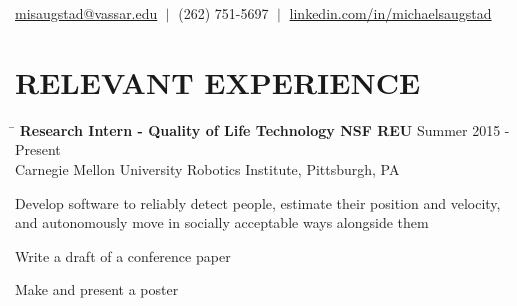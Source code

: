 \documentclass{res}
\newcommand{\vb}{\; | \;}
\begin{document}
 
                                  
\begin{resume}
\vspace{-5pt}
{\large %
  \begin{center}
    \href{mailto:misaugstad@vassar.edu}{misaugstad@vassar.edu} $\vb$
    (262) 751-5697 $\vb$
    \href{https://www.linkedin.com/in/michaelsaugstad/}
         {linkedin.com/in/michaelsaugstad}
  \end{center}

  \vspace{-3pt}
  \section{RELEVANT EXPERIENCE}
    \vspace{-3pt}	
    \begin{tabbing}
      \hspace{5in}\=  \kill %
      {\bf Research Intern - Quality of Life Technology NSF REU}%
      \>Summer 2015 - Present\\
      Carnegie Mellon University Robotics Institute, Pittsburgh, PA\\     
    \end{tabbing}
    \vspace{-24pt}      %
    \begin{list}{-}{}
      \setlength{\itemsep}{-2pt}
      \item Develop software to reliably detect people, estimate their
            position and velocity,\\ and autonomously move in socially
            acceptable ways alongside them
      \item Write a draft of a conference paper
      \item Make and present a poster
    \end{list}

}
\end{resume}
\end{document}
